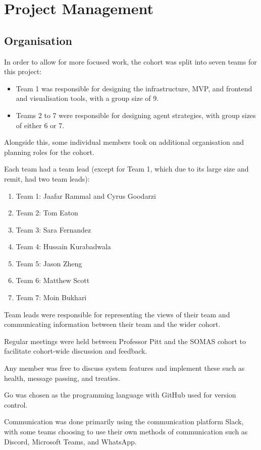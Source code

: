 \chapter{Project Management}\label{sec:proj-mgmt}

\section{Organisation}
In order to allow for more focused work, the cohort was split into seven teams for this project:
\begin{itemize}
    \item Team 1 was responsible for designing the infrastructure, MVP, and frontend and visualisation tools, with a group size of 9.
    \item Teams 2 to 7 were responsible for designing agent strategies, with group sizes of either 6 or 7.
\end{itemize}
Alongside this, some individual members took on additional organisation and planning roles for the cohort.

Each team had a team lead (except for Team 1, which due to its large size and remit, had two team leads):
\begin{enumerate}
    \item Team 1: Jaafar Rammal and Cyrus Goodarzi
    \item Team 2: Tom Eaton
    \item Team 3: Sara Fernandez
    \item Team 4: Hussain Kurabadwala
    \item Team 5: Jason Zheng
    \item Team 6: Matthew Scott
    \item Team 7: Moin Bukhari
\end{enumerate}
Team leads were responsible for representing the views of their team and communicating information between their team and the wider cohort.

Regular meetings were held between Professor Pitt and the SOMAS cohort to facilitate cohort-wide discussion and feedback.

Any member was free to discuss system features and implement these such as health, message passing, and treaties.

Go was chosen as the programming language with GitHub used for version control.

Communication was done primarily using the communication platform Slack, with some teams choosing to use their own methods of communication such as Discord, Microsoft Teams, and WhatsApp.

